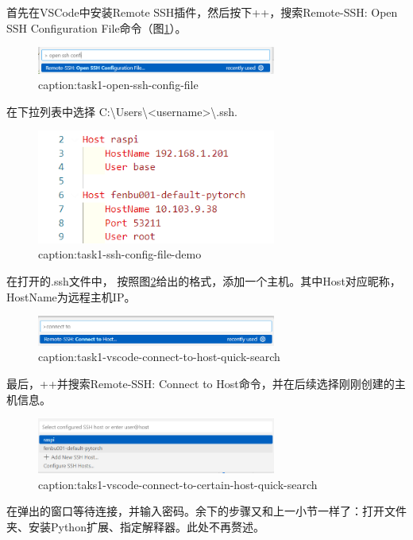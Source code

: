 首先在VSCode中安装Remote SSH插件，然后按下++，搜索Remote-SSH: Open SSH Configuration File命令（图\ref{fig:task1-open-ssh-config-file}）。
\begin{figure}[htbp]
	\centering
	\includegraphics[width=0.7\textwidth]{figures/task1-open-ssh-config-file.png}
	\caption{caption:task1-open-ssh-config-file}
	\label{fig:task1-open-ssh-config-file}
\end{figure}

在下拉列表中选择 C:\textbackslash Users\textbackslash <username>\textbackslash .ssh.

\begin{figure}[htbp]
	\centering
	\includegraphics[width=0.7\textwidth]{figures/task1-ssh-config-file-demo.png}
	\caption{caption:task1-ssh-config-file-demo}
	\label{fig:task1-ssh-config-file-demo}
\end{figure}

在打开的.ssh文件中， 按照图\ref*{fig:task1-ssh-config-file-demo}给出的格式，添加一个主机。其中Host对应昵称，HostName为远程主机IP。

\begin{figure}[htbp]
	\centering
	\includegraphics[width=0.7\textwidth]{figures/task1-vscode-connect-to-host-quick-search.png}
	\caption{caption:task1-vscode-connect-to-host-quick-search}
	\label{fig:task1-vscode-connect-to-host-quick-search}
\end{figure}

最后，++并搜索Remote-SSH: Connect to Host命令，并在后续选择刚刚创建的主机信息。

\begin{figure}[htbp]
	\centering
	\includegraphics[width=0.7\textwidth]{figures/taks1-vscode-connect-to-certain-host-quick-search.png}
	\caption{caption:taks1-vscode-connect-to-certain-host-quick-search}
	\label{fig:taks1-vscode-connect-to-certain-host-quick-search}
\end{figure}

在弹出的窗口等待连接，并输入密码。余下的步骤又和上一小节一样了：打开文件夹、安装Python扩展、指定解释器。此处不再赘述。
